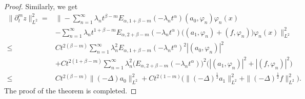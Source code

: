 \documentclass[11pt]{article}
\numberwithin{equation}{section}
\begin{document}
\begin{proof}
Similarly, we get \begin{align*} \|\partial_t^mz\|_{L^2}^2 
=&\bigg\|-\sum_{n=1}^{\infty}\lambda_nt^{\beta-m}E_{\alpha,1+\beta-m}(-\lambda_n t^\alpha)(a_0, \varphi_n)\varphi_n(x)\\
&-\sum_{n=1}^{\infty}\lambda_nt^{1+\beta-m}E_{\alpha,2+\beta-m}(-\lambda_n t^\alpha)\Big((a_1, \varphi_n)+(f, \varphi_n)\Big)\varphi_n(x)\bigg\|_{L^2}^2\\ 
\le&Ct^{2(\beta-m)}\sum_{n=1}^{\infty}\lambda_n^2E_{\alpha,1+\beta-m}(-\lambda_n t^\alpha)^2|(a_0, \varphi_n)|^2\\ 
&+Ct^{2(1+\beta-m)}\sum_{n=1}^{\infty}\lambda_n^2\big(E_{\alpha,2+\beta-m}(-\lambda_n t^\alpha)\big)^2\Big(|(a_1, \varphi_n)|^2+|(f, \varphi_n)|^2\Big)\\ \le&Ct^{2(\beta-m)} \|(-\Delta)a_0\|_{L^2}^2+Ct^{2(1 -m)}\Big(\|(-\Delta)^{\frac12}a_1\|_{L^2}^2+\|(-\Delta)^{\frac12}f\|_{L^2}^2\Big). 
\end{align*}
The proof of the theorem is completed.
\end{proof}
\end{document}
